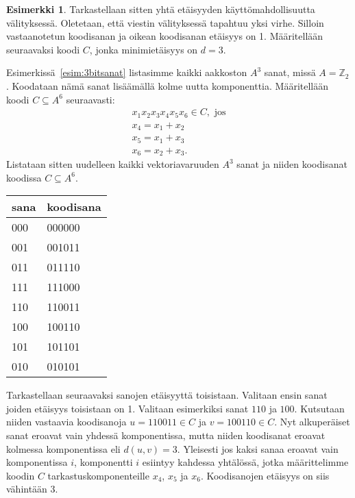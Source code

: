 \documentclass[a4paper,12pt,leqno,oneside]{report} %
\theoremstyle{plain}
\theoremstyle{definition}
\newtheorem{esimerkki}{Esimerkki}[chapter]
\theoremstyle{remark}
\numberwithin{equation}{chapter}
\newcommand*{\Zset}{\mathbb{Z}}  %
\begin{document}
    \begin{esimerkki}\label{esim:minetaisyys}
        Tarkastellaan sitten yhtä etäisyyden käyttömahdollisuutta välityksessä. Oletetaan, että viestin välityksessä tapahtuu yksi virhe. Silloin vastaanotetun koodisanan ja oikean koodisanan etäisyys on 1. Määritellään seuraavaksi koodi $C$, jonka minimietäisyys on $d = 3$.

        Esimerkissä~\ref{esim:3bitsanat} listasimme kaikki aakkoston $A^3$ sanat, missä $A = \Zset_2$. Koodataan nämä sanat lisäämällä kolme uutta komponenttia. Määritellään koodi $C \subseteq A^6$ seuraavasti:
        \begin{gather*}
            x_1x_2x_3x_4x_5x_6 \in C, \text{ jos} \\
            x_4 = x_1 + x_2 \\
            x_5 = x_1 + x_3 \\
            x_6 = x_2 + x_3.
        \end{gather*}
        Listataan sitten uudelleen kaikki vektoriavaruuden $A^3$ sanat ja niiden koodisanat koodissa $C \subseteq A^6$.
        \begin{center}
            \begin{tabular}[t]{ll}
                sana & koodisana \\ \midrule
                000 & 000000\\
                001 & 001011\\
                011 & 011110\\
                111 & 111000\\
                110 & 110011\\
                100 & 100110\\
                101 & 101101\\
                010 & 010101\\
            \end{tabular}
        \end{center}
        Tarkastellaan seuraavaksi sanojen etäisyyttä toisistaan. Valitaan ensin sanat joiden etäisyys toisistaan on 1. Valitaan esimerkiksi sanat $110$ ja $100$. Kutsutaan niiden vastaavia koodisanoja $u = 110011 \in C$ ja $v = 100110 \in C$. Nyt alkuperäiset sanat eroavat vain yhdessä komponentissa, mutta niiden koodisanat eroavat kolmessa komponentissa eli $d(u,v) = 3$. Yleisesti jos kaksi sanaa eroavat vain komponentissa $i$, komponentti $i$ esiintyy kahdessa yhtälössä, jotka määrittelimme koodin $C$ tarkastuskomponenteille
        $x_4$, $x_5$ ja $x_6$. Koodisanojen etäisyys on siis vähintään 3.


\end{esimerkki}
\end{document}
